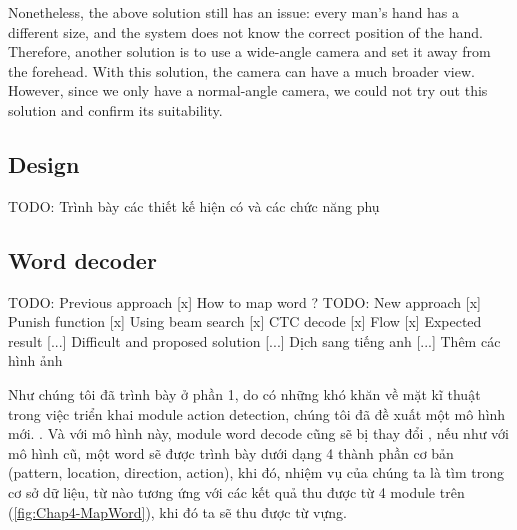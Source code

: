 Nonetheless, the above solution still has an issue: every man’s hand has a different size, and the system does not know the correct position of the hand. Therefore, another solution is to use a wide-angle camera and set it away from the forehead. With this solution, the camera can have a much broader view. However, since we only have a normal-angle camera, we could not try out this solution and confirm its suitability.

\subsection{ Design}
  TODO: Trình bày các thiết kế hiện có và các chức năng phụ

\subsection{Word decoder}
TODO:   Previous approach 
      [x] How to map word ?
TODO:   New approach
      [x] Punish function
      [x] Using beam search
      [x] CTC decode
      [x] Flow
      [x] Expected result
      [...] Difficult and proposed solution
      [...] Dịch sang tiếng anh
      [...] Thêm các hình ảnh



    Như chúng tôi đã trình bày ở phần 1, do có những khó khăn 
    về mặt kĩ thuật trong việc triển khai module
    action detection, chúng tôi đã đề xuất một mô hình mới.
    . Và với mô hình này, module word decode cũng sẽ bị thay đổi
    , nếu như với mô hình cũ, một word sẽ được trình bày dưới dạng
    4 thành phần cơ bản (pattern, location, direction, action),
    khi đó, nhiệm vụ của chúng ta là tìm trong cơ sở dữ liệu, từ nào
    tương ứng với các kết quả thu được từ 4 module trên (\ref{fig:Chap4-MapWord}), khi đó
    ta sẽ thu được từ vựng.


